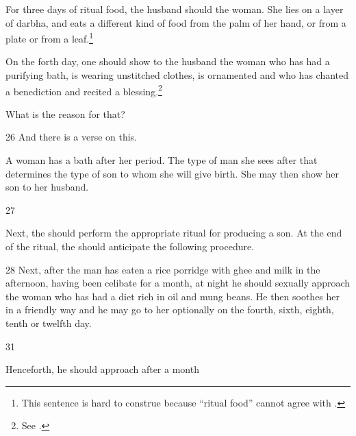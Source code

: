 \begin{translation}
For three days of ritual food, the husband should  the
woman.  She lies on a layer of \gls{darbha}, and eats a different kind of food
from the palm of her hand, or from a plate or from a leaf.\footnote{This
    sentence is hard to construe because  “ritual food” cannot 
    agree
    with .}

On the forth day, one should  show to the husband the woman 
who has
had a purifying bath, is wearing unstitched clothes, is ornamented and who has
chanted a benediction and recited a blessing.\footnote{See \cite[58 and
    fn.\,167]{wuja-2023}.}
    
    What is the reason for that?
     
     
     \item[26]
     And there is a verse on this.
     
     \begin{sloka}
         
         A woman has a bath after her period.  The type of man she sees after 
         that determines the type of son to whom she will give birth. She may then 
         show her son to her husband.     
           
     \end{sloka}
        
        \item[27]
        
\begin{sloka}
            Next, the  should perform the appropriate 
            ritual 
        for producing a son.  At the end of the ritual, the  
        should anticipate the following procedure. 
 
\end{sloka}       

\item [28]
        Next, after the man has eaten a rice porridge with ghee and milk in the
afternoon, having been celibate for a month, at night he should sexually
approach the woman who has had a diet rich in oil and mung beans.  He then
soothes her in a friendly way and he may go to her optionally on the fourth, 
sixth, eighth, tenth or twelfth day. 
        
        
 \item [31]

Henceforth, he should approach after a month


\end{translation}

